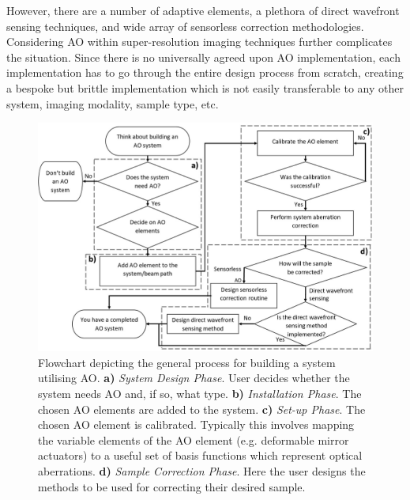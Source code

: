 However, there are a number of adaptive elements\cite{olivier2002advanced}, 
a plethora of direct wavefront sensing techniques\cite{antonello2014optimisation,trumper2016instantaneous,
	schwertner2004measurement}, and wide array of 
sensorless correction methodologies\cite{burke2015adaptive,booth2002adaptive,
	fienup2003aberration,antonello2020multi,debarre2007image}. 
Considering AO within super-resolution imaging techniques further complicates
the 
situation\cite{debarre2008adaptive,booth2015aberrations,thomas2015enhanced}.
Since there is no universally agreed upon AO implementation, each 
implementation has to go through the entire design process from scratch, 
creating a bespoke but brittle implementation which is not easily transferable
to any other system, imaging modality, sample type, etc. 

\begin{figure}[h]
	\centering
	\includegraphics[width=1\textwidth, scale=0.5]{./images/ao_system_setup_workflow_new.jpg}
	\caption[Flowchart depicting the general process for building a system utilising AO.]{Flowchart depicting the general process for building a system utilising AO. \textbf{a)} \textit{System Design Phase}. User decides whether the system needs AO and, if so, what type. \textbf{b)} \textit{Installation Phase}. The chosen AO elements are added to the system. \textbf{c)} \textit{Set-up Phase}. The chosen AO element is calibrated. Typically this involves mapping the variable elements of the AO element (e.g. deformable mirror actuators) to a useful set of basis functions which represent optical aberrations. \textbf{d)} \textit{Sample Correction Phase}. Here the user designs the methods to be used for correcting their desired sample.}
	\label{fig:ao_system_setup_workflow}
\end{figure}

